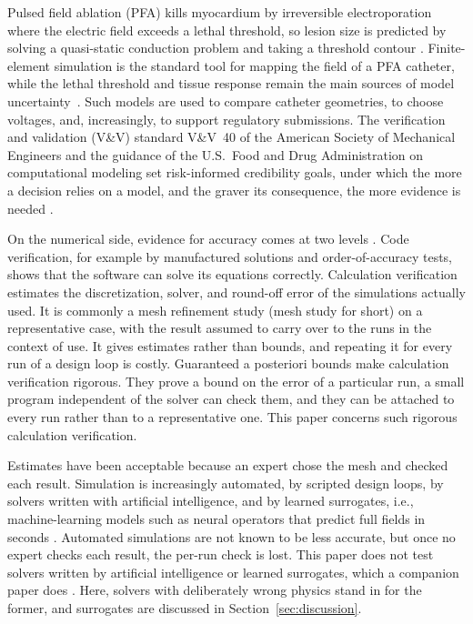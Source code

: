 \documentclass[11pt]{article}
\begin{document}
Pulsed field ablation (PFA) kills myocardium by irreversible electroporation
where
the electric field exceeds a lethal threshold, so lesion size is predicted by
solving a quasi-static conduction problem and taking a threshold contour
\cite{meckes2022,petras2025}. Finite-element simulation is the standard tool
for mapping the field of a PFA catheter, while the lethal threshold and tissue
response remain the main sources of model uncertainty~\cite{anic2026}.
Such models are used to compare catheter
geometries, to choose voltages, and, increasingly, to support regulatory
submissions. The verification and validation (V\&V) standard V\&V~40 of the
American Society of Mechanical Engineers and the guidance of the U.S.\ Food and
Drug Administration on computational modeling set risk-informed credibility
goals, under which the more a decision relies on a
model, and the graver its consequence, the more evidence is needed
\cite{asmevv40,fda2023}.

On the numerical side, evidence for accuracy comes at two levels
\cite{roache1998,oberkampf2010}. Code verification, for example by manufactured
solutions and order-of-accuracy tests, shows that the software can solve its
equations correctly. Calculation verification estimates the discretization,
solver, and round-off error of the simulations actually used. It is commonly a
mesh refinement study (mesh study for short) on a representative case, with the
result assumed to carry over to the runs in the context of use. It gives
estimates rather than bounds, and repeating it for every run of a design loop is
costly. Guaranteed a posteriori bounds make calculation verification rigorous.
They prove a bound on the error of a particular run, a small program independent
of the solver can check them, and they can be attached to every run rather than
to a representative one. This paper concerns such rigorous calculation verification.

Estimates have been acceptable because an expert chose the mesh and checked each
result. Simulation is increasingly automated, by scripted design loops, by solvers written
with artificial intelligence, and by learned surrogates, i.e., machine-learning
models such as neural operators that predict full fields in seconds
\cite{lu2021}. Automated simulations are not known to be
less accurate, but once no expert checks each result, the per-run check is
lost. This paper does not test solvers written by artificial intelligence or
learned surrogates, which a companion paper does \cite{dovelos2026b}. Here,
solvers with deliberately wrong physics stand in for the former, and surrogates
are discussed in Section~\ref{sec:discussion}.
\end{document}
